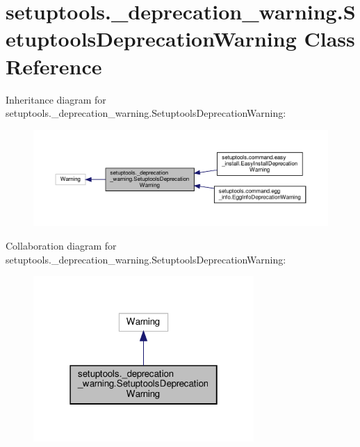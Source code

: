 \hypertarget{classsetuptools_1_1__deprecation__warning_1_1SetuptoolsDeprecationWarning}{}\section{setuptools.\+\_\+deprecation\+\_\+warning.\+Setuptools\+Deprecation\+Warning Class Reference}
\label{classsetuptools_1_1__deprecation__warning_1_1SetuptoolsDeprecationWarning}


Inheritance diagram for setuptools.\+\_\+deprecation\+\_\+warning.\+Setuptools\+Deprecation\+Warning\+:
\nopagebreak
\begin{figure}[H]
\begin{center}
\leavevmode
\includegraphics[width=350pt]{classsetuptools_1_1__deprecation__warning_1_1SetuptoolsDeprecationWarning__inherit__graph}
\end{center}
\end{figure}


Collaboration diagram for setuptools.\+\_\+deprecation\+\_\+warning.\+Setuptools\+Deprecation\+Warning\+:
\nopagebreak
\begin{figure}[H]
\begin{center}
\leavevmode
\includegraphics[width=238pt]{classsetuptools_1_1__deprecation__warning_1_1SetuptoolsDeprecationWarning__coll__graph}
\end{center}
\end{figure}


